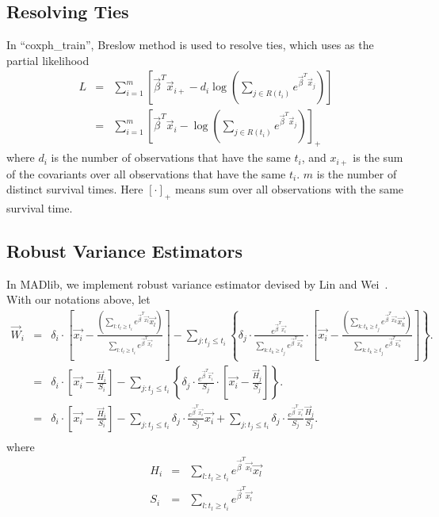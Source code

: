 \subsection{Resolving Ties}
In ``coxph\_train'', Breslow method is used to resolve ties, which uses
as the partial likelihood~\cite{hosmer2011applied}
\begin{eqnarray}
  L &=& \sum_{i=1}^{m}\left[ \vec{\beta}^{T} \vec{x}_{i+} -
    d_i \log\left( \sum_{j \in R(t_i)} e^{\vec{\beta}^T
        \vec{x}_j}\right) \right]\\
  &=& \sum_{i=1}^{m}\left[ \vec{\beta}^{T} \vec{x}_i - \log\left( \sum_{j \in R(t_i)} e^{\vec{\beta}^T
        \vec{x}_j}\right)\right]_{+}
\end{eqnarray}
where $d_i$ is the number of observations that have the same $t_i$,
and $x_{i+}$ is the sum of the covariants over all observations that
have the same $t_i$. $m$ is the number of distinct survival
times. Here $[\cdot]_{+}$ means sum over all observations with the
same survival time.

\subsection{Robust Variance Estimators}
In MADlib, we implement robust variance estimator devised by
Lin and Wei~\cite{lin1989robust}.
With our notations above, let
\begin{eqnarray*}
    \vec{W}_{i}
    &=& \delta_i \cdot \left[ \vec{x_i} - \frac{\left( \sum_{l: t_l \ge t_i} e^{\vec{\beta}^T \vec{x_l}} \vec{x_l} \right)}{\sum_{l: t_l \ge t_i} e^{\vec{\beta}^T \vec{x_l}}} \right]
    - \sum_{j: t_j \le t_i} \left\{ \delta_j \cdot \frac{e^{\vec{\beta}^T \vec{x_i}}}{\sum_{k: t_k \ge t_j} e^{\vec{\beta}^T \vec{x_k}}}
    \cdot \left[ \vec{x_i} - \frac{\left( \sum_{k: t_k \ge t_j} e^{\vec{\beta}^T \vec{x_k}} \vec{x_k} \right)}{\sum_{k: t_k \ge t_j} e^{\vec{\beta}^T \vec{x_k}}} \right] \right\}.\\
    &=& \delta_i \cdot \left[ \vec{x_i} - \frac{\vec{H}_i}{S_i} \right]
    - \sum_{j: t_j \le t_i} \left\{ \delta_j \cdot \frac{e^{\vec{\beta}^T \vec{x_i}}}{S_j}
    \cdot \left[ \vec{x_i} - \frac{\vec{H}_j}{S_j} \right] \right\}.\\
    &=& \delta_i \cdot \left[ \vec{x_i} - \frac{\vec{H}_i}{S_i} \right]
    - \sum_{j: t_j \le t_i} \delta_j \cdot \frac{e^{\vec{\beta}^T \vec{x_i}}}{S_j} \vec{x_i}
    + \sum_{j: t_j \le t_i} \delta_j \cdot \frac{e^{\vec{\beta}^T \vec{x_i}}}{S_j} \frac{\vec{H}_j}{S_j}.\\
\end{eqnarray*}
where
\begin{eqnarray*}
H_i &=&  \sum_{l: t_l \ge t_i} e^{\vec{\beta}^T \vec{x_l}} \vec{x_l}\\
S_i &=& \sum_{l: t_l \ge t_i} e^{\vec{\beta}^T \vec{x_l}}
\end{eqnarray*}

